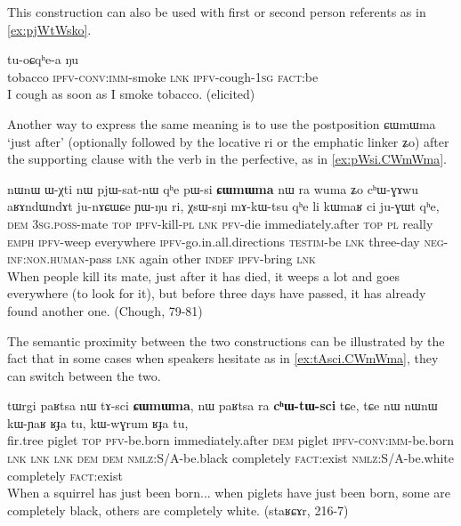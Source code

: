 \documentclass[oldfontcommands,oneside,a4paper,11pt]{article}
\newcommand{\ipa}[1]{{\phon \mbox{#1}}} %
\begin{document}
This construction can also be used with first or second person referents as in \ref{ex:pjWtWsko}.
 \begin{exe}
\ex \label{ex:pjWtWsko} 
\gll 
[\ipa{thamakʰa}   	\textbf{\ipa{pjɯ-tɯ-sko}}]   	\ipa{tɕe}   	\ipa{tu-oɕqʰe-a}   	\ipa{ŋu}   	\\
tobacco \textsc{ipfv-conv:imm}-smoke \textsc{lnk} \textsc{ipfv}-cough-\textsc{1sg} \textsc{fact}:be \\
 \glt I cough as soon as I smoke tobacco. (elicited)
\end{exe}

Another way to express the same meaning is to use the postposition \ipa{ɕɯmɯma}   `just after' (optionally followed by the locative \ipa{ri} or the emphatic linker \ipa{ʑo}) after the supporting clause with the verb in the perfective, as in \ref{ex:pWsi.CWmWma}.

 \begin{exe}
\ex \label{ex:pWsi.CWmWma} 
\gll 
\ipa{nɯnɯ}   	\ipa{ɯ-χti}   	\ipa{nɯ}   	\ipa{pjɯ-sat-nɯ}   	\ipa{qʰe}   	\ipa{pɯ-si}   	\ipa{\textbf{ɕɯmɯma}}   	\ipa{nɯ} \ipa{ra}   	\ipa{wuma}   	\ipa{ʑo}   	\ipa{cʰɯ-ɣɤwu}   	\ipa{aʁɤndɯndɤt}   	\ipa{ju-nɤɕɯɕe}   	\ipa{ɲɯ-ŋu}   	\ipa{ri,}   	\ipa{χsɯ-sŋi}   	\ipa{mɤ-kɯ-tsu}   	\ipa{qʰe}   	\ipa{li}   	\ipa{kɯmaʁ}   	\ipa{ci}   	\ipa{ju-ɣɯt}   	\ipa{qʰe,}   \\
\textsc{dem} \textsc{3sg.poss}-mate \textsc{top} \textsc{ipfv}-kill-\textsc{pl} \textsc{lnk} \textsc{pfv}-die  immediately.after \textsc{top} \textsc{pl} really \textsc{emph} \textsc{ipfv}-weep everywhere \textsc{ipfv}-go.in.all.directions \textsc{testim}-be \textsc{lnk} three-day \textsc{neg-inf:non.human}-pass \textsc{lnk} again other \textsc{indef} \textsc{ipfv}-bring \textsc{lnk} \\
\glt When people kill its mate, just after it has died, it weeps a lot and goes everywhere (to look for it), but before three days have passed, it has already found another one. (Chough, 79-81)
\end{exe}

The semantic proximity between the two constructions can be illustrated by the fact that in some cases when speakers hesitate as in \ref{ex:tAsci.CWmWma}, they can switch between the two.

 \begin{exe}
\ex \label{ex:tAsci.CWmWma} 
\gll 
\ipa{tɯrgi}   	\ipa{paʁtsa}   	\ipa{nɯ}   	\ipa{tɤ-sci}   	\ipa{\textbf{ɕɯmɯma},}   
\ipa{nɯ}   	\ipa{paʁtsa}   	\ipa{ra}   	\ipa{\textbf{cʰɯ-tɯ-sci}}   	\ipa{tɕe,}   	\ipa{tɕe}   	\ipa{nɯ}   
\ipa{nɯnɯ}   	\ipa{kɯ-ɲaʁ}   	\ipa{ʁɟa}   	\ipa{tu,}   	\ipa{kɯ-wɣrum}   	\ipa{ʁɟa}   	\ipa{tu,}   \\
fir.tree piglet \textsc{top} \textsc{pfv}-be.born immediately.after \textsc{dem} piglet \textsc{ipfv-conv:imm}-be.born \textsc{lnk} \textsc{lnk} \textsc{lnk} \textsc{dem} \textsc{dem} \textsc{nmlz}:S/A-be.black completely \textsc{fact}:exist \textsc{nmlz}:S/A-be.white completely \textsc{fact}:exist \\
\glt When a squirrel has just been born... when piglets have just been born, some are completely black, others are completely white. (staʁɕɤr, 216-7)
\end{exe}
\end{document}
